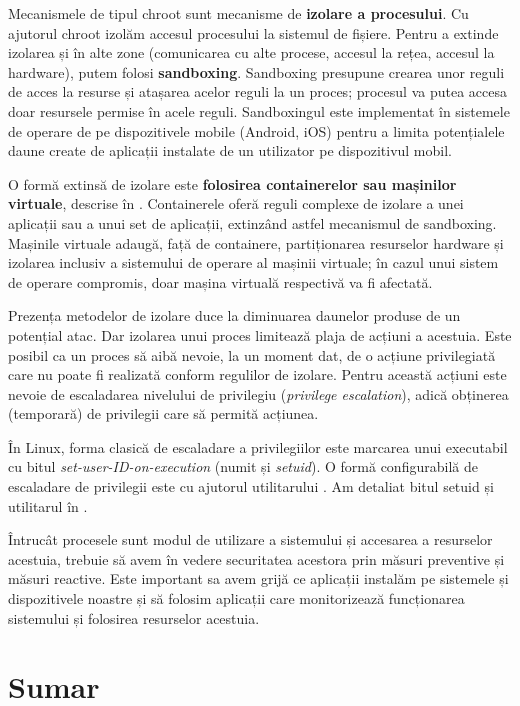 Mecanismele de tipul chroot sunt mecanisme de \textbf{izolare a procesului}. Cu ajutorul chroot izolăm accesul procesului la sistemul de fișiere. Pentru a extinde izolarea și în alte zone (comunicarea cu alte procese, accesul la rețea, accesul la hardware), putem folosi \textbf{sandboxing}. Sandboxing presupune crearea unor reguli de acces la resurse și atașarea acelor reguli la un proces; procesul va putea accesa doar resursele permise în acele reguli. Sandboxingul este implementat în sistemele de operare de pe dispozitivele mobile (Android, iOS) pentru a limita potențialele daune create de aplicații instalate de un utilizator pe dispozitivul mobil.

O formă extinsă de izolare este \textbf{folosirea containerelor sau mașinilor virtuale}, descrise în . Containerele oferă reguli complexe de izolare a unei aplicații sau a unui set de aplicații, extinzând astfel mecanismul de sandboxing. Mașinile virtuale adaugă, față de containere, partiționarea resurselor hardware și izolarea inclusiv a sistemului de operare al mașinii virtuale; în cazul unui sistem de operare compromis, doar mașina virtuală respectivă va fi afectată.

Prezența metodelor de izolare duce la diminuarea daunelor produse de un potențial atac. Dar izolarea unui proces limitează plaja de acțiuni a acestuia. Este posibil ca un proces să aibă nevoie, la un moment dat, de o acțiune privilegiată care nu poate fi realizată conform regulilor de izolare. Pentru această acțiuni este nevoie de escaladarea nivelului de privilegiu (\textit{privilege escalation}), adică obținerea (temporară) de privilegii care să permită acțiunea.

În Linux, forma clasică de escaladare a privilegiilor este marcarea unui executabil cu bitul \textit{set-user-ID-on-execution} (numit și \textit{setuid}).
O formă configurabilă de escaladare de privilegii este cu ajutorul utilitarului .
Am detaliat bitul setuid și utilitarul  în .

Întrucât procesele sunt modul de utilizare a sistemului și accesarea a resurselor acestuia, trebuie să avem în vedere securitatea acestora prin măsuri preventive și măsuri reactive. Este important sa avem grijă ce aplicații instalăm pe sistemele și dispozitivele noastre și să folosim aplicații care monitorizează funcționarea sistemului și folosirea resurselor acestuia.

\section{Sumar}
\label{sec:sec:summary}

